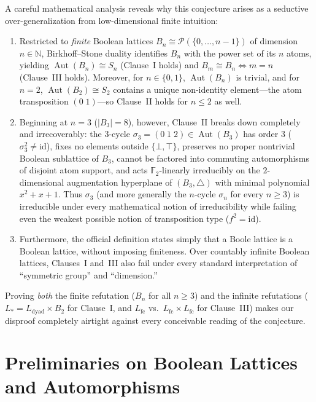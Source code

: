 \documentclass[11pt]{article}
\theoremstyle{definition}
\theoremstyle{remark}
\newcommand{\Aut}{\operatorname{Aut}}
\newcommand{\id}{\mathrm{id}}
\newcommand{\Ftwo}{\mathbb{F}_2}
\newcommand{\N}{\mathbb{N}}
\newcommand{\Ldyad}{L_{\mathrm{dyad}}}
\newcommand{\Lfc}{L_{\mathrm{fc}}}
\begin{document}
A careful mathematical analysis reveals why this conjecture arises as a seductive over-generalization from low-dimensional finite intuition:
\begin{enumerate}
  \item Restricted to \emph{finite} Boolean lattices $B_n \cong \mathcal{P}(\{0,\dots,n-1\})$ of dimension $n \in \N$, Birkhoff--Stone duality identifies $B_n$ with the power set of its $n$ atoms, yielding $\Aut(B_n) \cong S_n$ (Clause~I holds) and $B_m \cong B_n \iff m = n$ (Clause~III holds). Moreover, for $n \in \{0, 1\}$, $\Aut(B_n)$ is trivial, and for $n = 2$, $\Aut(B_2) \cong S_2$ contains a unique non-identity element---the atom transposition $(0\;1)$---so Clause~II holds for $n \le 2$ as well.
  \item Beginning at $n = 3$ ($|B_3| = 8$), however, Clause~II breaks down completely and irrecoverably: the $3$-cycle $\sigma_3 = (0\;1\;2) \in \Aut(B_3)$ has order $3$ ($\sigma_3^2 \neq \id$), fixes no elements outside $\{\bot, \top\}$, preserves no proper nontrivial Boolean sublattice of $B_3$, cannot be factored into commuting automorphisms of disjoint atom support, and acts $\Ftwo$-linearly irreducibly on the $2$-dimensional augmentation hyperplane of $(B_3, \triangle)$ with minimal polynomial $x^2 + x + 1$. Thus $\sigma_3$ (and more generally the $n$-cycle $\sigma_n$ for every $n \ge 3$) is irreducible under every mathematical notion of irreducibility while failing even the weakest possible notion of transposition type ($f^2 = \id$).
  \item Furthermore, the official definition states simply that a Boole lattice is a Boolean lattice, without imposing finiteness. Over countably infinite Boolean lattices, Clauses~I and~III also fail under every standard interpretation of ``symmetric group'' and ``dimension.''
\end{enumerate}

Proving \emph{both} the finite refutation ($B_n$ for all $n \ge 3$) and the infinite refutations ($L_* = \Ldyad \times B_2$ for Clause~I, and $\Lfc$ vs.\ $\Lfc \times \Lfc$ for Clause~III) makes our disproof completely airtight against every conceivable reading of the conjecture.

\section{Preliminaries on Boolean Lattices and Automorphisms}
\end{document}
